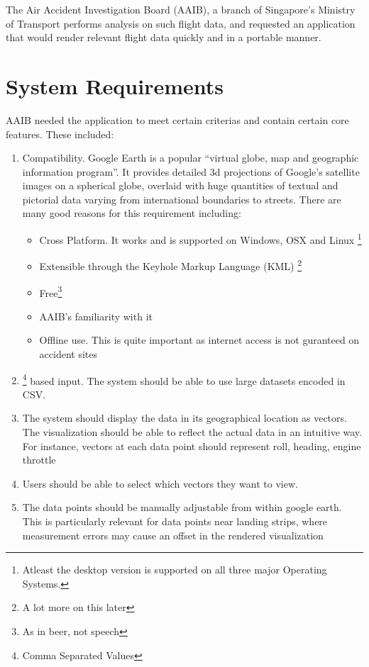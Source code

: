 The Air Accident Investigation Board (AAIB), a branch of Singapore's Ministry of Transport performs analysis on such flight data, and requested an application that would render relevant flight data quickly and in a portable manner. \\

\section{System Requirements}

AAIB needed the application to meet certain criterias and contain certain core features. These included:

\begin{enumerate}
  \item {} Compatibility. Google Earth is a popular ``virtual globe, map and geographic information program''. It provides detailed 3d projections of Google's satellite images on a spherical globe, overlaid with huge quantities of textual and pictorial data varying from international boundaries to streets. There are many good reasons for this requirement including:
    \begin{itemize}
      \item Cross Platform. It works and is supported on Windows, OSX and Linux \footnote{Atleast the desktop version is supported on all three major Operating Systems.}
      \item Extensible through the Keyhole Markup Language (KML) \footnote{A lot more on this later}
      \item Free\footnote{As in beer, not speech}
      \item AAIB's familiarity with it
      \item Offline use. This is quite important as internet access is not guranteed on accident sites
    \end{itemize}
  \item {}\footnote{Comma Separated Values} based input. The system should be able to use large datasets encoded in CSV.
  \item  The system should display the data in its geographical location as vectors. The visualization should be able to reflect the actual data in an intuitive way. For instance, vectors at each data point should represent roll, heading, engine throttle
  \item Users should be able to select which vectors they want to view.
  \item The data points should be manually adjustable from within google earth. This is particularly relevant for data points near landing strips, where measurement errors may cause an offset in the rendered visualization

\end{enumerate}
